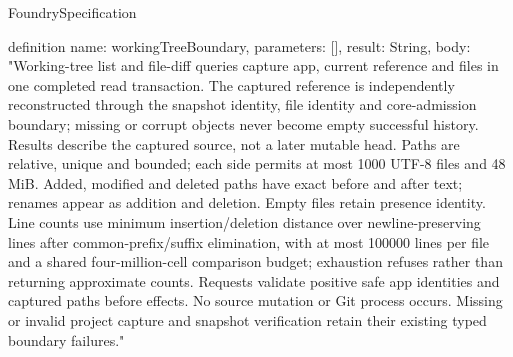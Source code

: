 \begin{lexlean}{FoundrySpecification}
\begin{semanticmodule}
definition{
  name: workingTreeBoundary,
  parameters: [],
  result: String,
  body: "Working-tree list and file-diff queries capture app, current reference and files in one completed read transaction. The captured reference is independently reconstructed through the snapshot identity, file identity and core-admission boundary; missing or corrupt objects never become empty successful history. Results describe the captured source, not a later mutable head. Paths are relative, unique and bounded; each side permits at most 1000 UTF-8 files and 48 MiB. Added, modified and deleted paths have exact before and after text; renames appear as addition and deletion. Empty files retain presence identity. Line counts use minimum insertion/deletion distance over newline-preserving lines after common-prefix/suffix elimination, with at most 100000 lines per file and a shared four-million-cell comparison budget; exhaustion refuses rather than returning approximate counts. Requests validate positive safe app identities and captured paths before effects. No source mutation or Git process occurs. Missing or invalid project capture and snapshot verification retain their existing typed boundary failures."
}


\end{semanticmodule}
\end{lexlean}
